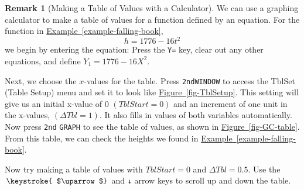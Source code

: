 \documentclass[10pt,]{book}
\theoremstyle{plain}
\theoremstyle{definition}
\newtheorem{remark}[theorem]{Remark}
\theoremstyle{definition}
\theoremstyle{definition}
\newlength{\panelmax}
\begin{document}
\begin{remark}[Making a Table of Values with a Calculator]\label{remark-1}
We can use a graphing calculator to make a table of values for a function defined by an equation. For the function in \hyperref[example-falling-book]{Example~\ref{example-falling-book}},%
\begin{equation*}
h = 1776 - 16t^2
\end{equation*}
we begin by entering the equation: Press the \lstinline?Y=? key, clear out any other equations, and define \(Y_1 = 1776 - 16X^2.\)%
\par
Next, we choose the \(x\)-values for the table. Press \lstinline?2nd?\lstinline?WINDOW? to access the TblSet (Table Setup) menu and set it to look like \hyperref[fig-TblSetup]{Figure~\ref{fig-TblSetup}}. This setting will give us an initial x-value of 0 \((TblStart = 0)\) and an increment of one unit in the x-values, \((\Delta Tbl = 1)\). It also fills in values of both variables automatically. Now press \lstinline?2nd? \lstinline?GRAPH? to see the table of values, as shown in \hyperref[fig-GC-table]{Figure~\ref{fig-GC-table}}. From this table, we can check the heights we found in \hyperref[example-falling-book]{Example~\ref{example-falling-book}}.%
\par
Now try making a table of values with \(TblStart = 0\) and \(\Delta Tbl = 0.5\). Use the  \(\keystroke{ $\uparrow$}\) and \lstinline?↓? arrow keys to scroll up and down the table.%
{%
\setlength{\panelmax}{0pt}
\newsavebox{\panelboxCimage}
\newlength{\phCimage}\setlength{\phCimage}{\ht\panelboxCimage+\dp\panelboxCimage}
\settototalheight{\phCimage}{\usebox{\panelboxCimage}}
\setlength{\panelmax}{\maxof{\panelmax}{\phCimage}}
\newsavebox{\panelboxDimage}
}
\end{remark}
\end{document}
